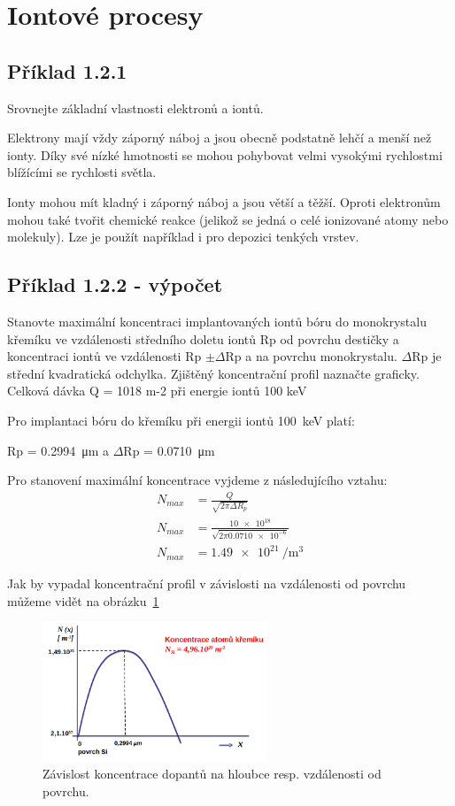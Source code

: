 \section{Iontové procesy}

\subsection{Příklad 1.2.1}
\begin{zadani}
    Srovnejte základní vlastnosti elektronů a iontů.
\end{zadani}

Elektrony mají vždy záporný náboj a jsou obecně podstatně lehčí a menší než ionty. Díky své nízké hmotnosti se mohou pohybovat velmi vysokými rychlostmi blížícími se rychlosti světla. 

Ionty mohou mít kladný i záporný náboj a jsou větší a těžší. Oproti elektronům mohou také tvořit chemické reakce (jelikož se jedná o celé ionizované atomy nebo molekuly). Lze je použít například i pro depozici tenkých vrstev.


\subsection{Příklad 1.2.2 - výpočet}
\begin{zadani}
    Stanovte maximální koncentraci implantovaných iontů bóru do 
    monokrystalu křemíku ve vzdálenosti středního doletu iontů  Rp od 
    povrchu destičky a koncentraci iontů ve vzdálenosti  Rp \(\pm \Delta\)Rp a na 
    povrchu monokrystalu.  \(\Delta\)Rp  je střední kvadratická odchylka. Zjištěný  
    koncentrační profil naznačte graficky. Celková dávka  Q = 1018 m-2 při  
    energie iontů  100 keV
\end{zadani}


Pro implantaci bóru do křemíku při energii iontů \qty{100}{keV} platí:

Rp = \qty{0,2994}{\micro\meter} a \(\Delta\)Rp = \qty{0,0710}{\micro\meter}

Pro stanovení maximální koncentrace vyjdeme z následujícího vztahu:
\begin{align*}
  N_{max} &= \frac{Q}{\sqrt{2\pi \Delta R_{p} } } \\
  N_{max} &= \frac{\num{10e18}}{\sqrt{2\pi \num{0,0710e-6} } } \\
  N_{max} &= \qty{1,49e21}{\per\meter\cubed}
\end{align*}

Jak by vypadal koncentrační profil v závislosti na vzdálenosti od povrchu můžeme vidět na obrázku~\ref{fig:img-profil}

\begin{figure}[h!]
  \centering
  \includegraphics[width=0.6\textwidth]{img/profil.png}
  \caption{Závislost koncentrace dopantů na hloubce resp. vzdálenosti od povrchu.}
  \label{fig:img-profil}
\end{figure}

